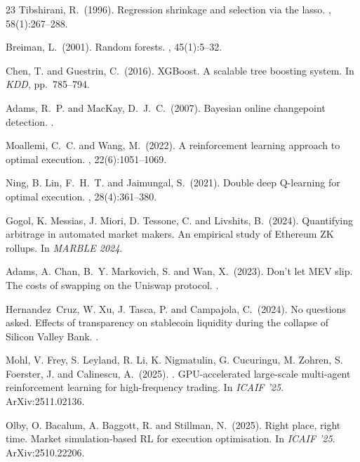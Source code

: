 \documentclass[sigconf,anonymous,natbib=false]{acmart}
\begin{document}
\begin{thebibliography}{23}
Tibshirani, R.\ (1996).
\newblock Regression shrinkage and selection via the lasso.
, 58(1):267--288.

Breiman, L.\ (2001).
\newblock Random forests.
, 45(1):5--32.

Chen, T. and Guestrin, C.\ (2016).
\newblock XGBoost. A scalable tree boosting system.
\newblock In {\em KDD}, pp.~785--794.

Adams, R.~P. and MacKay, D.~J.~C.\ (2007).
\newblock Bayesian online changepoint detection.
.

Moallemi, C.~C. and Wang, M.\ (2022).
\newblock A reinforcement learning approach to optimal execution.
, 22(6):1051--1069.

Ning, B. Lin, F.~H.~T. and Jaimungal, S.\ (2021).
\newblock Double deep Q-learning for optimal execution.
, 28(4):361--380.

Gogol, K. Messias, J. Miori, D. Tessone, C. and Livshits, B.\ (2024).
\newblock Quantifying arbitrage in automated market makers. An empirical study
  of {Ethereum} {ZK} rollups.
\newblock In {\em MARBLE 2024}.

Adams, A. Chan, B.~Y. Markovich, S. and Wan, X.\ (2023).
\newblock Don't let {MEV} slip. The costs of swapping on the {Uniswap}
  protocol.
.

Hernandez~Cruz, W. Xu, J. Tasca, P. and Campajola, C.\ (2024).
\newblock No questions asked. Effects of transparency on stablecoin liquidity
  during the collapse of {Silicon Valley Bank}.
.

Mohl, V. Frey, S. Leyland, R. Li, K. Nigmatulin, G. Cucuringu, M.
  Zohren, S. Foerster, J. and Calinescu, A.\ (2025).
. {GPU}-accelerated large-scale multi-agent
  reinforcement learning for high-frequency trading.
\newblock In {\em ICAIF '25}. ArXiv:2511.02136.

Olby, O. Bacalum, A. Baggott, R. and Stillman, N.\ (2025).
\newblock Right place, right time. Market simulation-based {RL} for execution
  optimisation.
\newblock In {\em ICAIF '25}. ArXiv:2510.22206.


\end{thebibliography}
\end{document}
